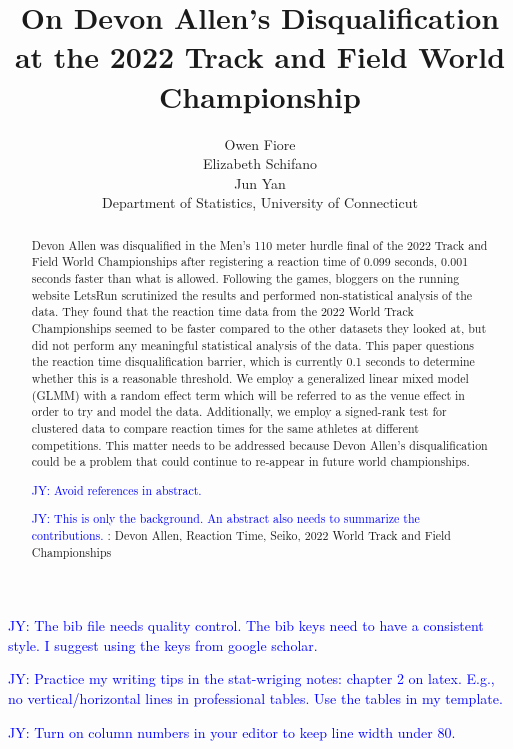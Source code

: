 \documentclass[12pt, letterpaper, titlepage]{article}
\title{On Devon Allen's Disqualification at the 2022 Track and Field World
Championship}
\author{Owen Fiore\\
  Elizabeth Schifano\\
  Jun Yan\\[1ex]
  Department of Statistics, University of Connecticut\\
}
\date{}
\newcommand{\jy}[1]{\textcolor{blue}{JY: #1}}
\begin{document}
\maketitle

\begin{abstract}
  Devon Allen was disqualified in the Men's 110 meter hurdle final of the 2022
  Track and Field World Championships after registering a reaction time of 0.099 seconds, 0.001 
  seconds faster than what is allowed.  Following the games, bloggers on the running website 
  LetsRun scrutinized the results and performed non-statistical analysis of the data.
  They found that the reaction time data from the 2022 World Track Championships seemed to be faster 
  compared to the other datasets they looked at, but did not perform any meaningful statistical 
  analysis of the data.  This paper questions the reaction time disqualification barrier, which is
  currently 0.1 seconds to determine whether this is a reasonable threshold.
  We employ a generalized linear mixed model (GLMM) with a random effect term
  which will be referred to as the venue effect in order to try and model the
  data.  Additionally, we employ a signed-rank test for clustered data to compare
  reaction times for the same athletes at different competitions.
  This matter needs to be addressed because Devon Allen's disqualification could 
  be a problem that could continue to re-appear in future world championships.

  \jy{Avoid references in abstract.}

  
  \jy{This is only the background. An abstract also needs to summarize the contributions.}
\noindent{}:
Devon Allen, Reaction Time, Seiko, 2022 World Track and Field Championships 

\end{abstract}

\doublespace

\jy{The bib file needs quality control. The bib keys need to have a consistent
  style. I suggest using the keys from google scholar.}

\jy{Practice my writing tips in the stat-wriging notes: chapter 2 on
  latex. E.g., no vertical/horizontal lines in professional tables. Use the
  tables in my template.}

\jy{Turn on column numbers in your editor to keep line width under 80.}
\end{document}
